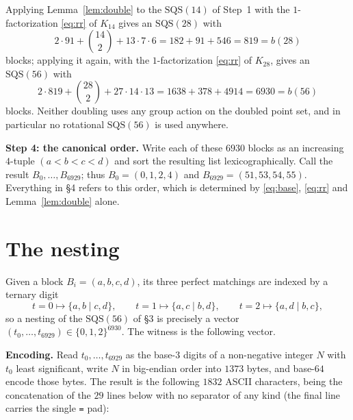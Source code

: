 \documentclass[11pt]{amsart}
\newcommand{\SQS}{\mathrm{SQS}}
\begin{document}
Applying Lemma~\ref{lem:double} to the $\SQS(14)$ of Step~1 with the
$1$-factorization \eqref{eq:rr} of $K_{14}$ gives an $\SQS(28)$ with
\[
 2\cdot91+\binom{14}{2}+13\cdot7\cdot6=182+91+546=819=b(28)
\]
blocks; applying it again, with the $1$-factorization \eqref{eq:rr} of
$K_{28}$, gives an $\SQS(56)$ with
\begin{equation}\label{eq:count56}
 2\cdot819+\binom{28}{2}+27\cdot14\cdot13=1638+378+4914=6930=b(56)
\end{equation}
blocks. Neither doubling uses any group action on the doubled point set, and in
particular no rotational $\SQS(56)$ is used anywhere.

\noindent\textbf{Step 4: the canonical order.} Write each of these $6930$
blocks as an increasing $4$-tuple $(a<b<c<d)$ and sort the resulting list
lexicographically. Call the result $B_0,\ldots,B_{6929}$; thus
$B_0=(0,1,2,4)$ and $B_{6929}=(51,53,54,55)$. Everything in \S4 refers to this
order, which is determined by \eqref{eq:base}, \eqref{eq:rr} and
Lemma~\ref{lem:double} alone.

\section{The nesting}

Given a block $B_i=(a,b,c,d)$, its three perfect matchings are indexed by a
ternary digit
\begin{equation}\label{eq:trit}
 t=0\mapsto\{a,b\mid c,d\},\qquad
 t=1\mapsto\{a,c\mid b,d\},\qquad
 t=2\mapsto\{a,d\mid b,c\},
\end{equation}
so a nesting of the $\SQS(56)$ of \S3 is precisely a vector
$(t_0,\ldots,t_{6929})\in\{0,1,2\}^{6930}$. The witness is the following
vector.

\noindent\textbf{Encoding.} Read $t_0,\ldots,t_{6929}$ as the base-$3$ digits
of a non-negative integer $N$ with $t_0$ least significant, write $N$ in
big-endian order into $1373$ bytes, and base-$64$ encode those bytes. The
result is the following $1832$ ASCII characters, being the concatenation of the
$29$ lines below with no separator of any kind (the final line carries the
single \verb|=| pad):
\end{document}
